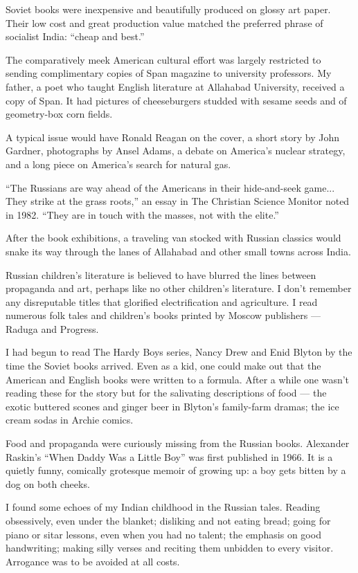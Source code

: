 Soviet books were inexpensive and beautifully produced on glossy art
paper. Their low cost and great production value matched the preferred
phrase of socialist India: ``cheap and best.''

The comparatively meek American cultural effort was largely restricted
to sending complimentary copies of Span magazine to university
professors. My father, a poet who taught English literature at Allahabad
University, received a copy of Span. It had pictures of cheeseburgers
studded with sesame seeds and of geometry-box corn fields.

A typical issue would have Ronald Reagan on the cover, a short story by
John Gardner, photographs by Ansel Adams, a debate on America's nuclear
strategy, and a long piece on America's search for natural gas.

``The Russians are way ahead of the Americans in their hide-and-seek
game... They strike at the grass roots,'' an essay in The Christian
Science Monitor noted in 1982. ``They are in touch with the masses, not
with the elite.''

After the book exhibitions, a traveling van stocked with Russian
classics would snake its way through the lanes of Allahabad and other
small towns across India.

Russian children's literature is believed to have blurred the lines
between propaganda and art, perhaps like no other children's literature.
I don't remember any disreputable titles that glorified electrification
and agriculture. I read numerous folk tales and children's books printed
by Moscow publishers --- Raduga and Progress.

I had begun to read The Hardy Boys series, Nancy Drew and Enid Blyton by
the time the Soviet books arrived. Even as a kid, one could make out
that the American and English books were written to a formula. After a
while one wasn't reading these for the story but for the salivating
descriptions of food --- the exotic buttered scones and ginger beer in
Blyton's family-farm dramas; the ice cream sodas in Archie comics.

Food and propaganda were curiously missing from the Russian books.
Alexander Raskin's ``When Daddy Was a Little Boy'' was first published
in 1966. It is a quietly funny, comically grotesque memoir of growing
up: a boy gets bitten by a dog on both cheeks.

I found some echoes of my Indian childhood in the Russian tales. Reading
obsessively, even under the blanket; disliking and not eating bread;
going for piano or sitar lessons, even when you had no talent; the
emphasis on good handwriting; making silly verses and reciting them
unbidden to every visitor. Arrogance was to be avoided at all costs.

